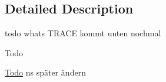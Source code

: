 \subsection{Detailed Description}
todo whats T\-R\-A\-C\-E kommt unten nochmal \begin{DoxyRefDesc}{Todo}
\item[\hyperlink{todo__todo000008}{Todo}]ns später ändern \end{DoxyRefDesc}
